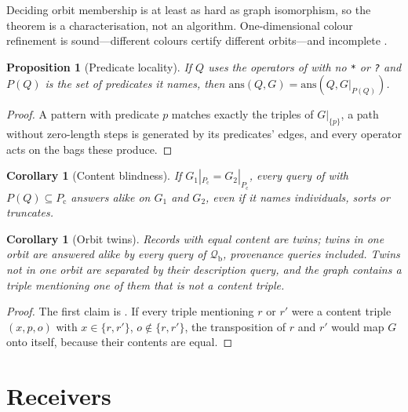 \documentclass[11pt,twocolumn,a4paper]{article}
\theoremstyle{plain}
\newtheorem{proposition}[theorem]{Proposition}
\newtheorem{corollary}[theorem]{Corollary}
\theoremstyle{definition}
\theoremstyle{remark}
\newcommand{\G}{G}
\newcommand{\Pc}{P_{\mathrm{c}}}
\newcommand{\Qfrag}{\mathcal{Q}_{\mathrm{b}}}
\newcommand{\ans}{\mathrm{ans}}
\begin{document}
Deciding orbit membership is at least as hard as graph isomorphism, so the
theorem is a characterisation, not an algorithm. One-dimensional colour
refinement \citep{weisfeiler1968} is sound---different colours certify
different orbits---and incomplete \citep{cai1992}.

\begin{proposition}[Predicate locality]
\label{prop:locality}
If $Q$ uses the operators of  with no \texttt{*} or \texttt{?}
and $P(Q)$ is the set of predicates it names, then
$\ans(Q,\G)=\ans(Q,\G|_{P(Q)})$.
\end{proposition}

\begin{proof}
A pattern with predicate $p$ matches exactly the triples of $\G|_{\{p\}}$, a path
without zero-length steps is generated by its predicates' edges, and every
operator acts on the bags these produce.
\end{proof}

\begin{corollary}[Content blindness]
\label{cor:contentblind}
If $\G_1|_{\Pc}=\G_2|_{\Pc}$, every query of  with
$P(Q)\subseteq\Pc$ answers alike on $\G_1$ and $\G_2$, even if it names
individuals, sorts or truncates.
\end{corollary}

\begin{corollary}[Orbit twins]
\label{cor:twin}
Records with equal content are \emph{twins}; twins in one orbit are answered
alike by every query of $\Qfrag$, provenance queries included. Twins not in
one orbit are separated by their description query, and the graph contains a
triple mentioning one of them that is not a content triple.
\end{corollary}

\begin{proof}
The first claim is . If every triple mentioning $r$ or $r'$ were
a content triple $(x,p,o)$ with $x\in\{r,r'\}$, $o\notin\{r,r'\}$, the
transposition of $r$ and $r'$ would map $\G$ onto itself, because their
contents are equal.
\end{proof}

\section{Receivers}
\label{sec:receivers}
\end{document}
